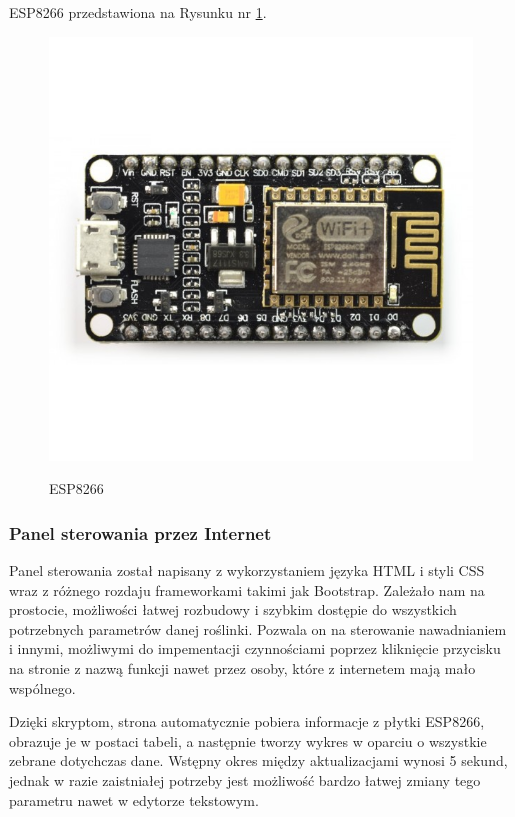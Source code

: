 \documentclass[12pt]{article}
\begin{document}
ESP8266 przedstawiona na Rysunku nr \ref{fig:esp}.
\begin{figure}[!h]
	\begin{center}
		{\includegraphics[width=12cm]{esp8266_photo.png}}
	\end{center}
	\caption{ESP8266}
	\label{fig:esp}
\end{figure}

\newpage
\subsubsection{Panel sterowania przez Internet}
Panel sterowania został napisany z wykorzystaniem języka HTML i styli CSS wraz z różnego rozdaju frameworkami takimi jak Bootstrap. Zależało nam na prostocie, możliwości łatwej rozbudowy i szybkim dostępie do wszystkich potrzebnych parametrów danej roślinki. Pozwala on na sterowanie nawadnianiem i innymi, możliwymi do impementacji czynnościami poprzez kliknięcie przycisku na stronie z nazwą funkcji nawet przez osoby, które z internetem mają mało wspólnego.


Dzięki skryptom, strona automatycznie pobiera informacje z płytki ESP8266, obrazuje je w postaci tabeli, a następnie tworzy wykres w oparciu o wszystkie zebrane dotychczas dane. Wstępny okres między aktualizacjami wynosi 5 sekund, jednak w razie zaistniałej potrzeby jest możliwość bardzo łatwej zmiany tego parametru nawet w edytorze tekstowym. 
\end{document}
